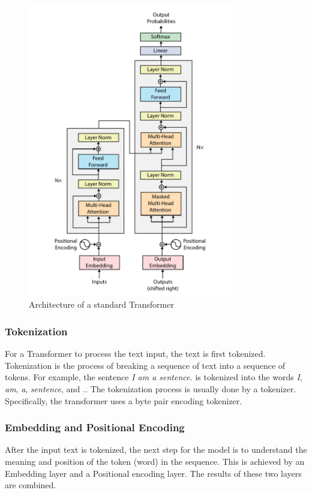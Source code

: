 \begin{figure}[htp]
    \centering
    \includegraphics[width=0.8\textwidth]{figures/transformer_architecture.pdf}
    \caption{Architecture of a standard Transformer \textcite{vaswani2017attention}}
    \label{fig:transformer-architecture}
\end{figure}


\subsubsection{Tokenization}
\label{sec:tokenization}
For a Transformer to process the text input, the text is first tokenized. Tokenization is the process of breaking a sequence of text into a sequence of tokens. For example, the sentence \textit{I am a sentence.} is tokenized into the words \textit{I}, \textit{am}, \textit{a}, \textit{sentence}, and \textit{.}. The tokenization process is usually done by a tokenizer. Specifically, the transformer uses a byte pair encoding tokenizer.

\subsubsection{Embedding and Positional Encoding}
\label{sec:embedding-and-positional-encoding}
After the input text is tokenized, the next step for the model is to understand the meaning and position of the token (word) in the sequence. This is achieved by an Embedding layer and a Positional encoding layer. The results of these two layers are combined.

